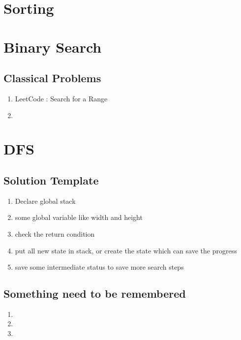 \chapter{ Sorting }

\chapter{ Binary Search }

\section{ Classical  Problems }

 \begin{enumerate}
    \item  LeetCode : Search for a Range

    \item   

\end{enumerate}

\chapter{ DFS }


\section{ Solution Template }

 \begin{enumerate}
    \item  Declare global stack

    \item  some global variable like width and height

    \item  check the return condition

    \item  put all new state in stack, or create the state which can save the progress

    \item save some intermediate status to save more search steps

\end{enumerate}

\section{ Something need to be remembered }

\begin{enumerate}
    \item
    \item
    \item

\end{enumerate}


